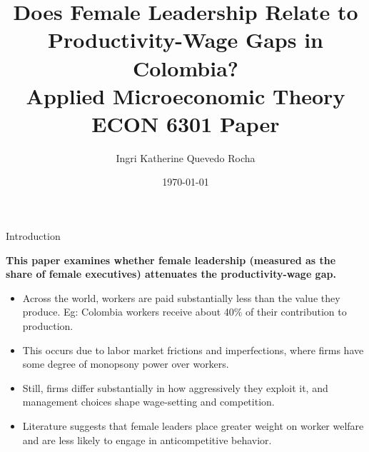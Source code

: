 \documentclass[11pt,aspectratio=169]{beamer}
\title{Does Female Leadership Relate to Productivity-Wage Gaps in Colombia? \\
{\small Applied Microeconomic Theory ECON 6301 Paper}}
\author{Ingri Katherine Quevedo Rocha}
\institute{\small \url{ingriq@gwu.edu} \\ George Washington University \\ M.S.\ Applied Economics (Spring 2026)}
\date{\today}
\begin{document}
 
\begin{frame}
  \titlepage
\end{frame}

\begin{frame}{Introduction}

\textbf{This paper examines whether female leadership (measured as the share of female executives) attenuates the productivity-wage gap.}
\vspace{0.2em}
\begin{itemize}
  \item Across the world, workers are paid substantially less than the value they produce. Eg: Colombia workers receive about 40\% of their contribution to production.
  \item This occurs due to labor market frictions and imperfections, where firms have some degree of monopsony power over workers.
  \item Still, firms differ substantially in how aggressively they exploit it, and management choices shape wage-setting and competition.
  \item Literature suggests that female leaders place greater weight on worker welfare and are less likely to engage in anticompetitive behavior.
\end{itemize}

\end{frame}


\end{document}
